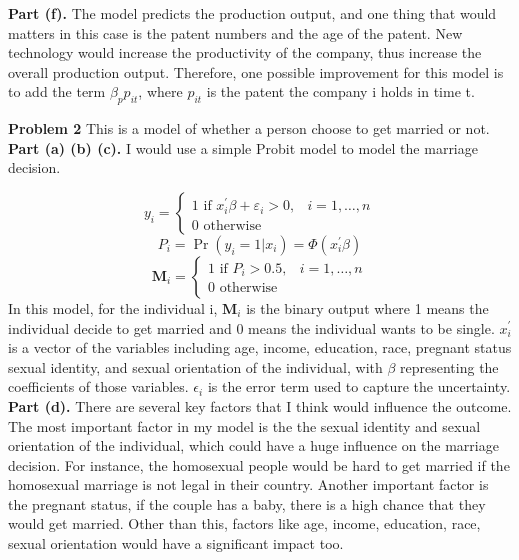 \documentclass[letterpaper,12pt]{article}
\theoremstyle{definition}
\begin{document}
\textbf{Part (f).} 
The model predicts the production output, and one thing that would matters in this case is the patent numbers and the age of the patent. New technology would increase the productivity of the company, thus increase the overall production output. 
Therefore, one possible improvement for this model is to add the term $\beta_{p} p_{i t}$, where $p_{i t}$ is the patent the company i holds in time t.
\\
\newpage

\noindent\textbf{Problem 2}
This is a model of whether a person choose to get married or not.\\

\textbf{Part (a) (b) (c).} I would use a simple Probit model to model the marriage decision.

$$
y_{i}=\left\{\begin{array}{ll}{1 \text { if } x_{i}^{\prime} \beta+\varepsilon_{i}>0,} & {i=1, \ldots, n} \\ {0 \text { otherwise }}\end{array}\right.
$$
$$
P_{i} = {\operatorname{Pr}\left(y_{i}=1 | x_{i}\right)=\Phi\left(x_{i}^{\prime} \beta\right)} 
$$
$$
\mathbf{M}_{i} = \left\{\begin{array}{ll}{1 \text { if } P_{i}>0.5,} & {i=1, \ldots, n} \\ {0 \text { otherwise }}\end{array}\right.
$$
In this model, for the individual i, $\mathbf{M}_{i}$ is the binary output where 1 means the individual decide to get married and 0 means the individual wants to be single. $x_{i}^{\prime}$ is a vector of the variables including age, income, education, race, pregnant status sexual identity, and sexual orientation of the individual, with $\beta$ representing the coefficients of those variables. $\epsilon_{i}$ is the error term used to capture the uncertainty.
\\

\textbf{Part (d).} 
There are several key factors that I think would influence the outcome. The most important factor in my model is the the sexual identity and sexual orientation of the individual, which could have a huge influence on the marriage decision. For instance, the homosexual people would be hard to get married if the homosexual marriage is not legal in their country. Another important factor is the pregnant status, if the couple has a baby, there is a high chance that they would get married. Other than this, factors like age, income, education, race, sexual orientation would have a significant impact too.
\\
\end{document}
